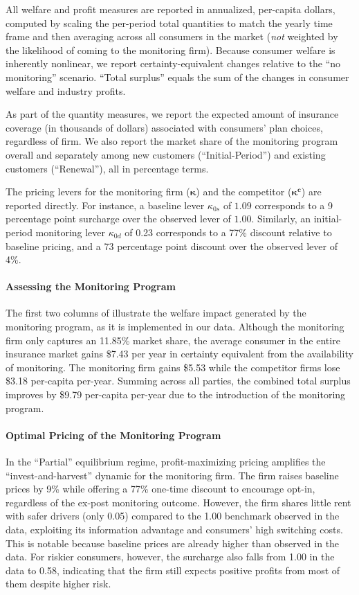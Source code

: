 All welfare and profit measures are reported in annualized, per-capita dollars, computed by scaling the per-period total quantities to match the yearly time frame and then averaging across all consumers in the market (\textit{not} weighted by the likelihood of coming to the monitoring firm). Because consumer welfare is inherently nonlinear, we report certainty-equivalent changes relative to the ``no monitoring'' scenario. ``Total surplus'' equals the sum of the changes in consumer welfare and industry profits.

As part of the quantity measures, we report the expected amount of insurance coverage (in thousands of dollars) associated with consumers' plan choices, regardless of firm. We also report the market share of the monitoring program overall and separately among new customers (``Initial-Period'') and existing customers (``Renewal''), all in percentage terms.

The pricing levers for the monitoring firm ($\boldsymbol{\kappa}$) and the competitor ($\boldsymbol{\kappa^c}$) are reported directly. For instance, a baseline lever $\kappa_{0s}$ of $1.09$ corresponds to a 9 percentage point surcharge over the observed lever of $1.00$. Similarly, an initial-period monitoring lever  $\kappa_{0d}$ of 0.23 corresponds to a 77\% discount relative to baseline pricing, and a 73 percentage point discount over the observed lever of 4\%.


\paragraph{Assessing the Monitoring Program}
The first two columns of  illustrate the welfare impact generated by the monitoring program, as it is implemented in our data. Although the monitoring firm only captures an 11.85\% market share, the average consumer in the entire insurance market gains \$7.43 per year in certainty equivalent from the availability of monitoring. The monitoring firm gains \$5.53 while the competitor firms lose \$3.18 per-capita per-year. Summing across all parties, the combined total surplus improves by \$9.79 per-capita per-year due to the introduction of the monitoring program.

\paragraph{Optimal Pricing of the Monitoring Program}
In the ``Partial'' equilibrium regime, profit-maximizing pricing amplifies the ``invest-and-harvest'' dynamic for the monitoring firm. The firm raises baseline prices by 9\% while offering a 77\% one-time discount to encourage opt-in, regardless of the ex-post monitoring outcome. However, the firm shares little rent with safer drivers (only 0.05) compared to the 1.00 benchmark observed in the data, exploiting its information advantage and consumers' high switching costs. This is notable because baseline prices are already higher than observed in the data. For riskier consumers, however, the surcharge also falls from 1.00 in the data to 0.58, indicating that the firm still expects positive profits from most of them despite higher risk.

